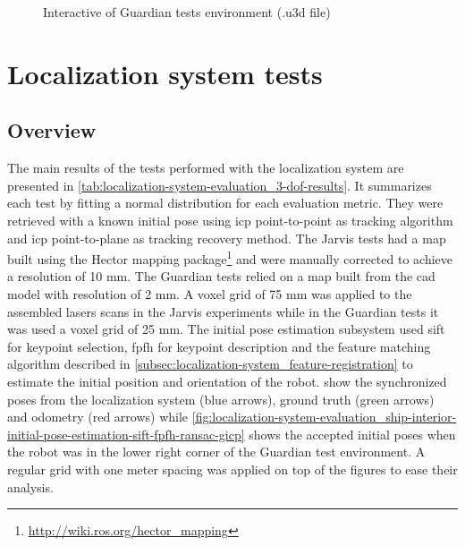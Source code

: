 \begin{figure}[H]
	\centering
	\caption{Interactive  of Guardian tests environment (.u3d file)}
	\label{fig:localization-system-evaluation_guardian-tests-environment-interactive}
\end{figure}


\section{Localization system tests}


\subsection{Overview}

The main results of the tests performed with the localization system are presented in \cref{tab:localization-system-evaluation_3-dof-results}. It summarizes each test by fitting a normal distribution for each evaluation metric. They were retrieved with a known initial pose using \gls{icp} point-to-point as tracking algorithm and \gls{icp} point-to-plane as tracking recovery method. The Jarvis tests had a map built using the Hector mapping package\footnote{\url{http://wiki.ros.org/hector_mapping}} and were manually corrected to achieve a resolution of 10 mm. The Guardian tests relied on a map built from the \gls{cad} model with resolution of 2 mm. A voxel grid of 75 mm was applied to the assembled lasers scans in the Jarvis experiments while in the Guardian tests it was used a voxel grid of 25 mm. The initial pose estimation subsystem used \gls{sift} for keypoint selection, \gls{fpfh} for keypoint description and the feature matching algorithm described in \cref{subsec:localization-system_feature-registration} to estimate the initial position and orientation of the robot.  show the synchronized poses from the localization system (blue arrows), ground truth (green arrows) and odometry (red arrows) while \cref{fig:localization-system-evaluation_ship-interior-initial-pose-estimation-sift-fpfh-ransac-gicp} shows the accepted initial poses when the robot was in the lower right corner of the Guardian test environment. A regular grid with one meter spacing was applied on top of the figures to ease their analysis.


